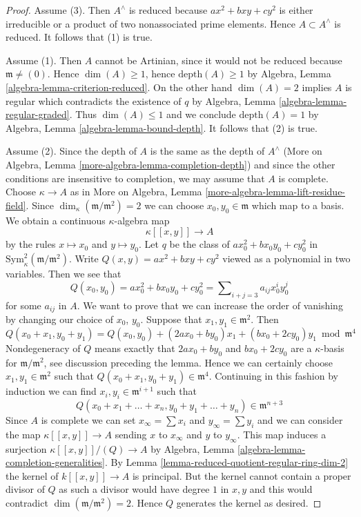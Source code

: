 \begin{proof}
Assume (3). Then $A^\wedge$ is reduced because $ax^2 + bxy + cy^2$
is either irreducible or a product of two nonassociated prime elements.
Hence $A \subset A^\wedge$ is reduced. It follows that (1) is true.

\medskip\noindent
Assume (1). Then $A$ cannot be Artinian, since it would not be reduced
because $\mathfrak m \not = (0)$.
Hence $\dim(A) \geq 1$, hence $\text{depth}(A) \geq 1$
by Algebra, Lemma \ref{algebra-lemma-criterion-reduced}.
On the other hand $\dim(A) = 2$ implies $A$ is regular
which contradicts the existence of $q$ by
Algebra, Lemma \ref{algebra-lemma-regular-graded}.
Thus $\dim(A) \leq 1$ and we conclude $\text{depth}(A) = 1$
by Algebra, Lemma \ref{algebra-lemma-bound-depth}.
It follows that (2) is true.

\medskip\noindent
Assume (2). Since the depth of $A$ is the same as the depth of $A^\wedge$
(More on Algebra, Lemma \ref{more-algebra-lemma-completion-depth})
and since the other conditions are insensitive to completion, we may
assume that $A$ is complete. Choose $\kappa \to A$ as in
More on Algebra, Lemma \ref{more-algebra-lemma-lift-residue-field}.
Since $\dim_\kappa(\mathfrak m/\mathfrak m^2) = 2$ we can choose
$x_0, y_0 \in \mathfrak m$ which map to a basis.
We obtain a continuous $\kappa$-algebra map
$$
\kappa[[x, y]] \longrightarrow A
$$
by the rules $x \mapsto x_0$ and $y \mapsto y_0$. Let
$q$ be the class of $ax_0^2 + bx_0y_0 + cy_0^2$ in
$\text{Sym}^2_\kappa(\mathfrak m/\mathfrak m^2)$.
Write $Q(x, y) = ax^2 + bxy + cy^2$ viewed as a polynomial
in two variables. Then we see that
$$
Q(x_0, y_0) = ax_0^2 + bx_0y_0 + cy_0^2 =
\sum\nolimits_{i + j = 3} a_{ij} x_0^iy_0^j
$$
for some $a_{ij}$ in $A$. We want to prove that we can
increase the order of vanishing by changing our choice
of $x_0$, $y_0$. Suppose that $x_1, y_1 \in \mathfrak m^2$.
Then
$$
Q(x_0 + x_1, y_0 + y_1) = Q(x_0, y_0) +
(2ax_0 + by_0)x_1 + (bx_0 + 2cy_0)y_1 \bmod \mathfrak m^4
$$
Nondegeneracy of $Q$ means exactly that $2ax_0 + by_0$ and $bx_0 + 2cy_0$
are a $\kappa$-basis for $\mathfrak m/\mathfrak m^2$, see discussion
preceding the lemma. Hence we can
certainly choose $x_1, y_1 \in \mathfrak m^2$ such that
$Q(x_0 + x_1, y_0 + y_1) \in \mathfrak m^4$.
Continuing in this fashion by induction
we can find $x_i, y_i \in \mathfrak m^{i + 1}$
such that
$$
Q(x_0 + x_1 + \ldots + x_n, y_0 + y_1 + \ldots + y_n) \in \mathfrak m^{n + 3}
$$
Since $A$ is complete we can set
$x_\infty = \sum x_i$ and $y_\infty = \sum y_i$
and we can consider the map $\kappa[[x, y]] \longrightarrow A$
sending $x$ to $x_\infty$ and $y$ to $y_\infty$. This map
induces a surjection $\kappa[[x, y]]/(Q) \longrightarrow A$ by
Algebra, Lemma \ref{algebra-lemma-completion-generalities}.
By Lemma \ref{lemma-reduced-quotient-regular-ring-dim-2}
the kernel of $k[[x, y]] \to A$ is principal.
But the kernel cannot contain a proper divisor of $Q$
as such a divisor would have degree $1$ in $x, y$
and this would contradict $\dim(\mathfrak m/\mathfrak m^2) = 2$.
Hence $Q$ generates the kernel as desired.
\end{proof}

